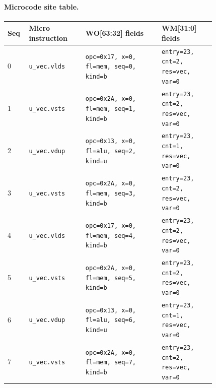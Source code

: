 \paragraph{Microcode site table.}
{\scriptsize
\begin{longtable}{@{}R{0.055\linewidth}L{0.23\linewidth}L{0.31\linewidth}L{0.22\linewidth}@{}}
\toprule
Seq & Micro instruction & WO[63:32] fields & WM[31:0] fields \\
 & \texttt{u\_vec.vlds} & \texttt{opc=0x17, x=0, fl=mem, seq=0, kind=b} & \texttt{entry=23, cnt=2, res=vec, var=0} \\
1 & \texttt{u\_vec.vsts} & \texttt{opc=0x2A, x=0, fl=mem, seq=1, kind=b} & \texttt{entry=23, cnt=2, res=vec, var=0} \\
2 & \texttt{u\_vec.vdup} & \texttt{opc=0x13, x=0, fl=alu, seq=2, kind=u} & \texttt{entry=23, cnt=1, res=vec, var=0} \\
3 & \texttt{u\_vec.vsts} & \texttt{opc=0x2A, x=0, fl=mem, seq=3, kind=b} & \texttt{entry=23, cnt=2, res=vec, var=0} \\
4 & \texttt{u\_vec.vlds} & \texttt{opc=0x17, x=0, fl=mem, seq=4, kind=b} & \texttt{entry=23, cnt=2, res=vec, var=0} \\
5 & \texttt{u\_vec.vsts} & \texttt{opc=0x2A, x=0, fl=mem, seq=5, kind=b} & \texttt{entry=23, cnt=2, res=vec, var=0} \\
6 & \texttt{u\_vec.vdup} & \texttt{opc=0x13, x=0, fl=alu, seq=6, kind=u} & \texttt{entry=23, cnt=1, res=vec, var=0} \\
7 & \texttt{u\_vec.vsts} & \texttt{opc=0x2A, x=0, fl=mem, seq=7, kind=b} & \texttt{entry=23, cnt=2, res=vec, var=0} \\
\bottomrule
\end{longtable}
}
